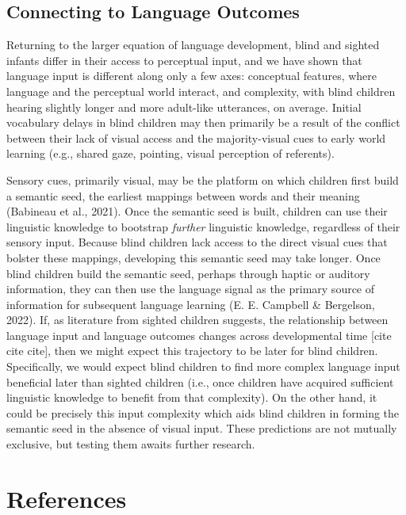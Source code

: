 \documentclass[
  man,floatsintext]{apa6}
\begin{document}
\hypertarget{connecting-to-language-outcomes}{%
\subsection{Connecting to Language Outcomes}\label{connecting-to-language-outcomes}}

Returning to the larger equation of language development, blind and sighted infants differ in their access to perceptual input, and we have shown that language input is different along only a few axes: conceptual features, where language and the perceptual world interact, and complexity, with blind children hearing slightly longer and more adult-like utterances, on average. Initial vocabulary delays in blind children may then primarily be a result of the conflict between their lack of visual access and the majority-visual cues to early world learning (e.g., shared gaze, pointing, visual perception of referents).

Sensory cues, primarily visual, may be the platform on which children first build a semantic seed, the earliest mappings between words and their meaning (Babineau et al., 2021). Once the semantic seed is built, children can use their linguistic knowledge to bootstrap \emph{further} linguistic knowledge, regardless of their sensory input. Because blind children lack access to the direct visual cues that bolster these mappings, developing this semantic seed may take longer. Once blind children build the semantic seed, perhaps through haptic or auditory information, they can then use the language signal as the primary source of information for subsequent language learning (E. E. Campbell \& Bergelson, 2022). If, as literature from sighted children suggests, the relationship between language input and language outcomes changes across developmental time {[}cite cite cite{]}, then we might expect this trajectory to be later for blind children. Specifically, we would expect blind children to find more complex language input beneficial later than sighted children (i.e., once children have acquired sufficient linguistic knowledge to benefit from that complexity). On the other hand, it could be precisely this input complexity which aids blind children in forming the semantic seed in the absence of visual input. These predictions are not mutually exclusive, but testing them awaits further research.

\pagebreak

\hypertarget{references}{%
\section{References}\label{references}}
\end{document}
